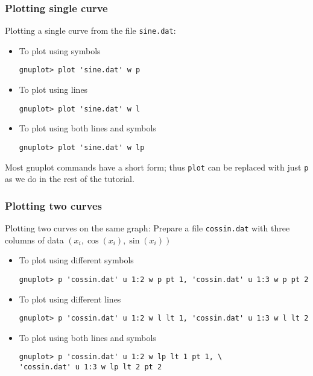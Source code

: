\documentclass[11pt,oneside]{amsart}
\begin{document}
\subsubsection{Plotting single curve}
Plotting a single curve from the file {\tt sine.dat}:

\begin{itemize}

\item To plot using symbols
\begin{verbatim}
gnuplot> plot 'sine.dat' w p
\end{verbatim}

\item To plot using lines
\begin{verbatim}
gnuplot> plot 'sine.dat' w l
\end{verbatim}

\item To plot using both lines and symbols
\begin{verbatim}
gnuplot> plot 'sine.dat' w lp
\end{verbatim}

\end{itemize}
Most gnuplot commands have a short form; thus {\tt plot} can be replaced with just {\tt p} as we do in the rest of the tutorial.

\subsubsection{Plotting two curves}
Plotting two curves on the same graph: Prepare a file {\tt cossin.dat} with three columns of data $(x_i, \cos(x_i), \sin(x_i))$

\begin{itemize}

\item To plot using different symbols
\begin{verbatim}
gnuplot> p 'cossin.dat' u 1:2 w p pt 1, 'cossin.dat' u 1:3 w p pt 2
\end{verbatim}

\item To plot using different lines
\begin{verbatim}
gnuplot> p 'cossin.dat' u 1:2 w l lt 1, 'cossin.dat' u 1:3 w l lt 2
\end{verbatim}

\item To plot using both lines and symbols
\begin{verbatim}
gnuplot> p 'cossin.dat' u 1:2 w lp lt 1 pt 1, \
'cossin.dat' u 1:3 w lp lt 2 pt 2
\end{verbatim}

\end{itemize}
\end{document}
